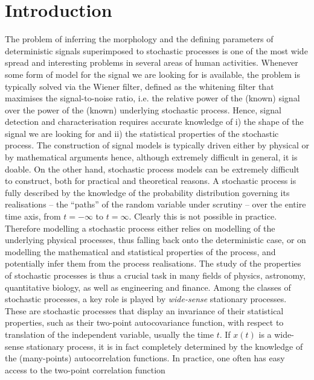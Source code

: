 \documentclass{aa}
\begin{document}
	
	\maketitle


\section{Introduction}

The problem of inferring the morphology and the defining parameters of deterministic signals superimposed to stochastic processes is one of the most wide spread and interesting problems in several areas of human activities. Whenever some form of model for the signal we are looking for is available, the problem is typically solved via the Wiener filter, defined as the whitening filter that maximises the signal-to-noise ratio, i.e. the relative power of the (known) signal over the power of the (known) underlying stochastic process. Hence, signal detection and characterisation requires accurate knowledge of i) the shape of the signal we are looking for and ii) the statistical properties of the stochastic process. The construction of signal models is typically driven either by physical or by mathematical arguments hence, although extremely difficult in general, it is doable. On the other hand, stochastic process models can be extremely difficult to construct, both for practical and theoretical reasons. A stochastic process is fully described by the knowledge of the probability distribution governing its realisations -- the ``paths'' of the random variable under scrutiny -- over the entire time axis, from $t=-\infty$ to $t=\infty$. Clearly this is not possible in practice. Therefore modelling a stochastic process either relies on modelling of the underlying physical processes, thus falling back onto the deterministic case, or on modelling the mathematical and statistical properties of the process, and potentially infer them from the process realisations. The study of the properties of stochastic processes is thus a crucial task in many fields of physics, astronomy, quantitative biology, as well as engineering and finance. Among the classes of stochastic processes, a key role is played by \textit{wide-sense} stationary processes. These are stochastic processes that display an invariance of their statistical properties, such as their two-point autocovariance function, with respect to translation of the independent variable, usually the time $t$. If $x(t)$ is a wide-sense stationary process, it is in fact completely determined by the knowledge of the (many-points) autocorrelation functions. In practice, one often has easy access to the two-point correlation function 
\end{document}
